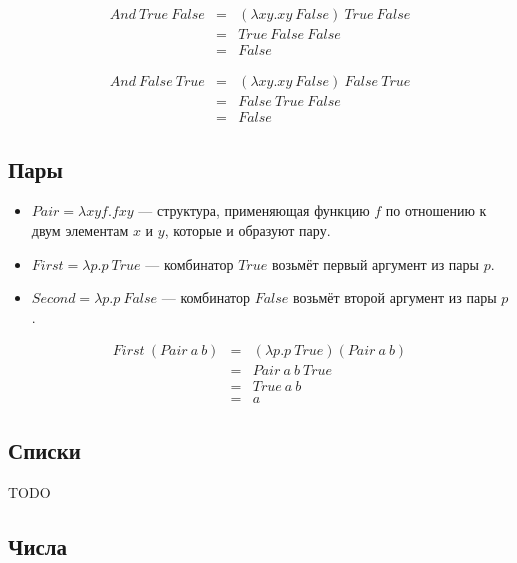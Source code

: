 \begin{equation*}
    \begin{array}{rcl}
        And\ True\ False &=& (\lambda xy. xy\ False)\ True\ False \\ 
        &=& True\ False\ False \\
        &=& False
    \end{array}    
\end{equation*}

\begin{equation*}
    \begin{array}{rcl}
        And\ False\ True &=& (\lambda xy. xy\ False)\ False\ True \\ 
        &=& False\ True\ False \\
        &=& False
    \end{array}    
\end{equation*}

\subsection*{Пары}

\begin{itemize}
    \item $Pair = \lambda xyf. fxy$ --- структура, применяющая функцию $f$ по отношению к двум элементам $x$ и $y$, которые и образуют пару.
    \item $First = \lambda p.p\ True$ --- комбинатор $True$ возьмёт первый аргумент из пары $p$.
    \item $Second = \lambda p.p\ False$ --- комбинатор $False$ возьмёт второй аргумент из пары $p$.
\end{itemize}

\begin{equation*}
    \begin{array}{rcl}
        First\ (Pair\ a\ b) &=& (\lambda p.p\ True) (Pair\ a\ b) \\
        &=& Pair\ a\ b\ True \\
        &=& True\ a\ b \\ 
        &=& a
    \end{array}
\end{equation*}

\subsection*{Списки}

TODO

\subsection*{Числа}

